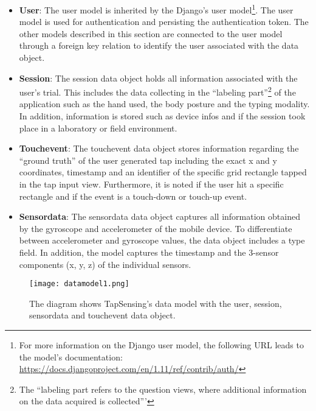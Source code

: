 \begin{itemize}
  \item \textbf{User}: The user model is inherited by the Django's user model\footnote{For more information on the Django user model, the following URL leads to the model's documentation: \url{https://docs.djangoproject.com/en/1.11/ref/contrib/auth/}}. The user model is used for authentication and persisting the authentication token. The other models described in this section are connected to the user model through a foreign key relation to identify the user associated with the data object.
  \item \textbf{Session}: The session data object holds all information associated with the user's trial. This includes the data collecting in the ``labeling part''\footnote{The ``labeling part refers to the question views, where additional information on the data acquired is collected'''} of the application such as the hand used, the body posture and the typing modality. In addition, information is stored such as device infos and if the session took place in a laboratory or field environment.
  \item \textbf{Touchevent}: The touchevent data object stores information regarding the ``ground truth'' of the user generated tap including the exact x and y coordinates, timestamp and an identifier of the specific grid rectangle tapped in the tap input view. Furthermore, it is noted if the user hit a specific rectangle and if the event is a touch-down or touch-up event.
  \item \textbf{Sensordata}: The sensordata data object captures all information obtained by the gyroscope and accelerometer of the mobile device. To differentiate between accelerometer and gyroscope values, the data object includes a type field. In addition, the model captures the timestamp and the 3-sensor components (x, y, z) of the individual sensors.
\end{itemize}

\begin{figure}[h!]
  \centering
  \texttt{[image: datamodel1.png]}
  \caption{The diagram shows TapSensing's data model with the user, session, sensordata and touchevent data object.} \label{fig:datamodel}
\end{figure}



